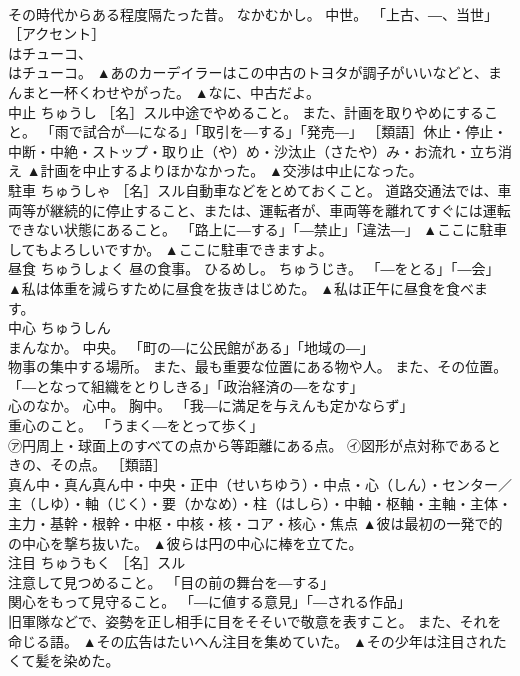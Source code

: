 \documentclass[8pt]{extreport}
\begin{document}
\begin{CJK}{UTF8}{min}
\\	その時代からある程度隔たった昔。 なかむかし。 中世。 「上古、―、当世」 ［アクセント］ 
\\	はチューコ、 
\\	はチューコ。	▲あのカーデイラーはこの中古のトヨタが調子がいいなどと、まんまと一杯くわせやがった。 ▲なに、中古だよ。
\\	中止	ちゅうし	［名］スル中途でやめること。 また、計画を取りやめにすること。 「雨で試合が―になる」「取引を―する」「発売―」 ［類語］休止・停止・中断・中絶・ストップ・取り止（や）め・沙汰止（さたや）み・お流れ・立ち消え	▲計画を中止するよりほかなかった。 ▲交渉は中止になった。
\\	駐車	ちゅうしゃ	［名］スル自動車などをとめておくこと。 道路交通法では、車両等が継続的に停止すること、または、運転者が、車両等を離れてすぐには運転できない状態にあること。 「路上に―する」「―禁止」「違法―」	▲ここに駐車してもよろしいですか。 ▲ここに駐車できますよ。
\\	昼食	ちゅうしょく	昼の食事。 ひるめし。 ちゅうじき。 「―をとる」「―会」	▲私は体重を減らすために昼食を抜きはじめた。 ▲私は正午に昼食を食べます。
\\	中心	ちゅうしん	
\\	まんなか。 中央。 「町の―に公民館がある」「地域の―」 
\\	物事の集中する場所。 また、最も重要な位置にある物や人。 また、その位置。 「―となって組織をとりしきる」「政治経済の―をなす」 
\\	心のなか。 心中。 胸中。 「我―に満足を与えんも定かならず」 
\\	重心のこと。 「うまく―をとって歩く」 
\\	㋐円周上・球面上のすべての点から等距離にある点。 ㋑図形が点対称であるときの、その点。 ［類語］
\\	真ん中・真ん真ん中・中央・正中（せいちゆう）・中点・心（しん）・センター／
\\	主（しゆ）・軸（じく）・要（かなめ）・柱（はしら）・中軸・枢軸・主軸・主体・主力・基幹・根幹・中枢・中核・核・コア・核心・焦点	▲彼は最初の一発で的の中心を撃ち抜いた。 ▲彼らは円の中心に棒を立てた。
\\	注目	ちゅうもく	［名］スル 
\\	注意して見つめること。 「目の前の舞台を―する」 
\\	関心をもって見守ること。 「―に値する意見」「―される作品」 
\\	旧軍隊などで、姿勢を正し相手に目をそそいで敬意を表すこと。 また、それを命じる語。	▲その広告はたいへん注目を集めていた。 ▲その少年は注目されたくて髪を染めた。

\end{CJK}
\end{document}
